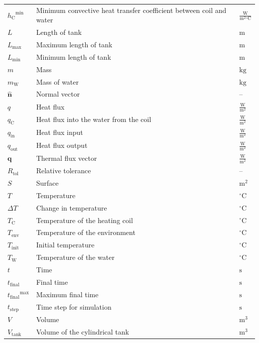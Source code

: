 \documentclass[12pt]{article}
\begin{document}
\begin{longtabu}{l X[l] l}
${{h_{\text{C}}}^{\text{min}}}$ & Minimum convective heat transfer coefficient between coil and water & $\frac{\text{W}}{\text{m}^{2}{}^{\circ}\text{C}}$
\\
$L$ & Length of tank & ${\text{m}}$
\\
${L_{\text{max}}}$ & Maximum length of tank & ${\text{m}}$
\\
${L_{\text{min}}}$ & Minimum length of tank & ${\text{m}}$
\\
$m$ & Mass & ${\text{kg}}$
\\
${m_{\text{W}}}$ & Mass of water & ${\text{kg}}$
\\
$\symbf{\hat{n}}$ & Normal vector & --
\\
$q$ & Heat flux & $\frac{\text{W}}{\text{m}^{2}}$
\\
${q_{\text{C}}}$ & Heat flux into the water from the coil & $\frac{\text{W}}{\text{m}^{2}}$
\\
${q_{\text{in}}}$ & Heat flux input & $\frac{\text{W}}{\text{m}^{2}}$
\\
${q_{\text{out}}}$ & Heat flux output & $\frac{\text{W}}{\text{m}^{2}}$
\\
$\symbf{q}$ & Thermal flux vector & $\frac{\text{W}}{\text{m}^{2}}$
\\
${R_{\text{tol}}}$ & Relative tolerance & --
\\
$S$ & Surface & ${\text{m}^{2}}$
\\
$T$ & Temperature & ${{}^{\circ}\text{C}}$
\\
$ΔT$ & Change in temperature & ${{}^{\circ}\text{C}}$
\\
${T_{\text{C}}}$ & Temperature of the heating coil & ${{}^{\circ}\text{C}}$
\\
${T_{\text{env}}}$ & Temperature of the environment & ${{}^{\circ}\text{C}}$
\\
${T_{\text{init}}}$ & Initial temperature & ${{}^{\circ}\text{C}}$
\\
${T_{\text{W}}}$ & Temperature of the water & ${{}^{\circ}\text{C}}$
\\
$t$ & Time & ${\text{s}}$
\\
${t_{\text{final}}}$ & Final time & ${\text{s}}$
\\
${{t_{\text{final}}}^{\text{max}}}$ & Maximum final time & ${\text{s}}$
\\
${t_{\text{step}}}$ & Time step for simulation & ${\text{s}}$
\\
$V$ & Volume & ${\text{m}^{3}}$
\\
${V_{\text{tank}}}$ & Volume of the cylindrical tank & ${\text{m}^{3}}$

\end{longtabu}
\end{document}
